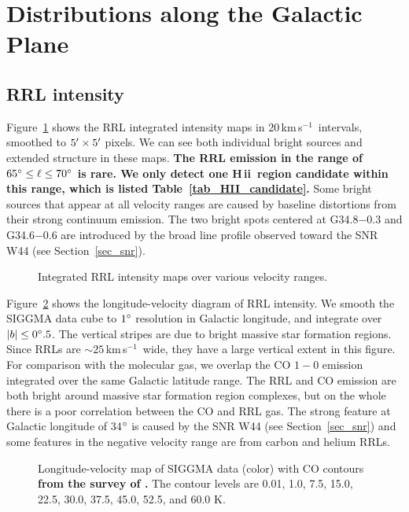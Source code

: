 \documentclass[manuscript]{aastex61}
\newcommand{\hii}{{\rm H\,}{{\sc ii}}}
\newcommand{\kms}{\,km\,s$^{-1}$}
\begin{document}
\section{Distributions along the Galactic Plane} \label{sec_gal}
\subsection{RRL intensity} \label{sec_gal_rrl}
Figure~\ref{fig_rrl_map} shows the RRL integrated intensity maps in 20\kms\ intervals, smoothed to $5\mbox{$^\prime$} \times 5\mbox{$^\prime$}$ pixels.
We can see both individual bright sources and extended structure in these maps.
\textbf{The RRL emission in the range of $65\mbox{$^\circ$} \leq \ell \leq  70\mbox{$^\circ$}$ is rare. 
We only detect one \hii\ region candidate within this range, which is listed Table~\ref{tab_HII_candidate}.}
Some bright sources that appear at all velocity ranges are caused by baseline distortions from their strong continuum emission.
The two bright spots centered at G34.8$-$0.3 and G34.6$-$0.6 are introduced by the broad line profile observed toward the SNR W44 (see Section~\ref{sec_snr}).

\begin{figure}[htbp]
\caption{Integrated RRL intensity maps over various velocity ranges.
}\label{fig_rrl_map}
\end{figure}

Figure~\ref{lv_map} shows the longitude-velocity diagram of RRL intensity.
We smooth the SIGGMA data cube to $1\mbox{$^\circ$}$ resolution in Galactic longitude, and integrate over $|b| \leq 0\mbox{$^\circ$}.5$.
The vertical stripes are due to bright massive star formation regions.  Since RRLs are $\sim25$\kms\ wide, they have a large vertical extent in this figure.
For comparison with the molecular gas, we overlap the CO $1-0$ emission \citep{Dame2001} integrated over the same Galactic latitude range.
The RRL and CO emission are both bright around massive star formation region complexes, but on the whole there is a poor correlation between the CO and RRL gas.
The strong feature at Galactic longitude of 34$\mbox{$^\circ$}$ is caused by the SNR W44 (see Section~\ref{sec_snr}) and some features in the negative velocity range are from carbon and helium RRLs.
\begin{figure}[htbp]
\centering
{}
\caption{Longitude-velocity map of  SIGGMA data (color) with CO contours \textbf{from the survey of \citep{Dame2001}.} The contour levels are 0.01, 1.0, 7.5, 15.0, 22.5, 30.0, 37.5, 45.0, 52.5, and 60.0 K.}\label{lv_map}
\end{figure}
\end{document}
